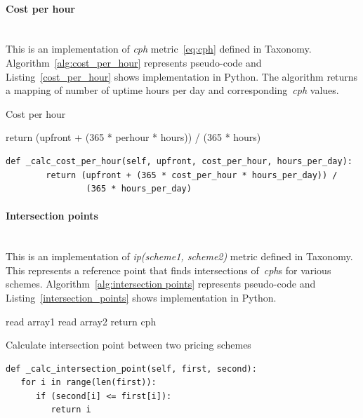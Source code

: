 \documentclass[]{final_report}
\newcommand{\myparagraph}[1]{\paragraph{#1}\mbox{}\\}
\begin{document}
\myparagraph{Cost per hour}

This is an implementation of \textit{cph} metric~\ref{eq:cph} defined in Taxonomy. Algorithm~\ref{alg:cost_per_hour} represents pseudo-code and Listing~\ref{cost_per_hour} shows implementation in Python. The algorithm returns a mapping of number of uptime hours per day and corresponding~\textit{cph} values.

\begin{algorithm}[H]
 \caption{Cost per hour}
 \label{alg:cost_per_hour}
 return (upfront + (365 * perhour * hours)) / (365 * hours)
\end{algorithm}

\begin{minipage}{\linewidth}
\begin{lstlisting}[label={cost_per_hour},caption={Cost per hour implementation in Python},frame=single] 
def _calc_cost_per_hour(self, upfront, cost_per_hour, hours_per_day):
        return (upfront + (365 * cost_per_hour * hours_per_day)) /
                (365 * hours_per_day)
\end{lstlisting}
\end{minipage}

\myparagraph{Intersection points}

This is an implementation of \textit{ip(scheme1, scheme2)} metric defined in Taxonomy. This represents a reference point that finds intersections of~\textit{cph}s for various schemes. Algorithm~\ref{alg:intersection points} represents pseudo-code and Listing~\ref{intersection_points} shows implementation in Python. 

\begin{algorithm}[H]
 \label{alg:intersection points}
 read array1\;
 read array2\;
  {
 	 {
 		return cph
 	}
 }
\caption{Calculate intersection point between two pricing schemes}
\end{algorithm}

\begin{minipage}{\linewidth}
\begin{lstlisting}[label={intersection_points},caption={Intersection point between various pricing schemes},frame=single] 
def _calc_intersection_point(self, first, second):
   for i in range(len(first)):
      if (second[i] <= first[i]):
         return i
\end{lstlisting}
\end{minipage}
\end{document}
